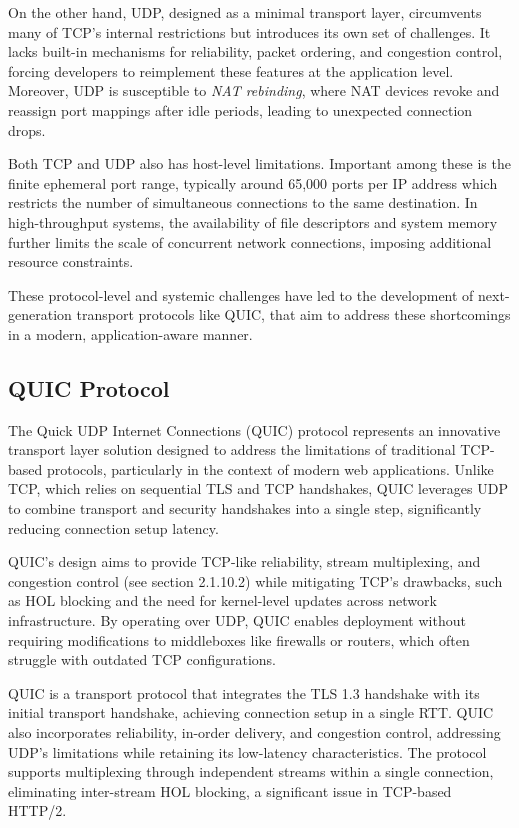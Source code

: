 On the other hand, UDP, designed as a minimal transport layer, circumvents many of TCP’s internal restrictions but introduces its own set of challenges. It lacks built-in mechanisms for reliability, packet ordering, and congestion control, forcing developers to reimplement these features at the application level. Moreover, UDP is susceptible to \textit{NAT rebinding}, where NAT devices revoke and reassign port mappings after idle periods, leading to unexpected connection drops.

Both TCP and UDP also has  host-level limitations. Important among these is the finite ephemeral port range, typically around 65,000 ports per IP address which restricts the number of simultaneous connections to the same destination. In high-throughput systems, the availability of file descriptors and system memory further limits the scale of concurrent network connections, imposing additional resource constraints.

These protocol-level and systemic challenges have led to the development of next-generation transport protocols like QUIC, that aim to address these shortcomings in a modern, application-aware manner.

\subsection{QUIC Protocol}

The Quick UDP Internet Connections (QUIC) protocol represents an innovative transport layer solution designed to address the limitations of traditional TCP-based protocols, particularly in the context of modern web applications. Unlike TCP, which relies on sequential TLS and TCP handshakes, QUIC leverages UDP to combine transport and security handshakes into a single step, significantly reducing connection setup latency.

QUIC’s design aims to provide TCP-like reliability, stream multiplexing, and congestion control (see section 2.1.10.2) while mitigating TCP’s drawbacks, such as HOL blocking and the need for kernel-level updates across network infrastructure. By operating over UDP, QUIC enables deployment without requiring modifications to middleboxes like firewalls or routers, which often struggle with outdated TCP configurations. 

QUIC is a transport protocol that integrates the TLS 1.3 handshake with its initial transport handshake, achieving connection setup in a single RTT. QUIC also incorporates reliability, in-order delivery, and congestion control, addressing UDP’s limitations while retaining its low-latency characteristics. The protocol supports multiplexing through independent streams within a single connection, eliminating inter-stream HOL blocking, a significant issue in TCP-based HTTP/2. 

